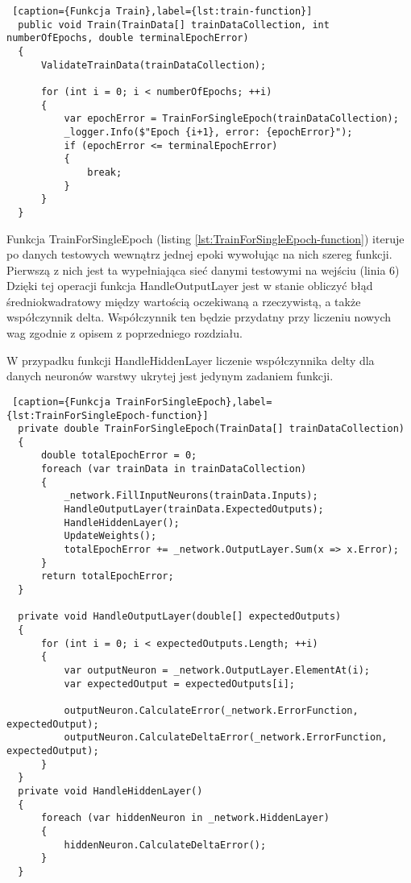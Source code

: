 \begin{lstlisting} [caption={Funkcja Train},label={lst:train-function}]
  public void Train(TrainData[] trainDataCollection, int numberOfEpochs, double terminalEpochError)
  {
      ValidateTrainData(trainDataCollection);

      for (int i = 0; i < numberOfEpochs; ++i)
      {
          var epochError = TrainForSingleEpoch(trainDataCollection);
          _logger.Info($"Epoch {i+1}, error: {epochError}");
          if (epochError <= terminalEpochError)
          {
              break;
          }
      }
  }
\end{lstlisting}

Funkcja TrainForSingleEpoch (listing \ref{lst:TrainForSingleEpoch-function}) iteruje po danych testowych wewnątrz jednej epoki wywołując na nich szereg funkcji.
Pierwszą z nich jest ta wypełniająca sieć danymi testowymi na wejściu (linia 6)
Dzięki tej operacji funkcja HandleOutputLayer jest w stanie obliczyć błąd średniokwadratowy między wartością oczekiwaną a rzeczywistą, a także współczynnik delta.
Współczynnik ten będzie przydatny przy liczeniu nowych wag zgodnie z opisem z poprzedniego rozdziału.

W przypadku funkcji HandleHiddenLayer liczenie współczynnika delty dla danych neuronów warstwy ukrytej jest jedynym zadaniem funkcji.


\begin{lstlisting} [caption={Funkcja TrainForSingleEpoch},label={lst:TrainForSingleEpoch-function}]
  private double TrainForSingleEpoch(TrainData[] trainDataCollection)
  {
      double totalEpochError = 0;
      foreach (var trainData in trainDataCollection)
      {
          _network.FillInputNeurons(trainData.Inputs);
          HandleOutputLayer(trainData.ExpectedOutputs);
          HandleHiddenLayer();
          UpdateWeights();
          totalEpochError += _network.OutputLayer.Sum(x => x.Error);
      }
      return totalEpochError;
  }

  private void HandleOutputLayer(double[] expectedOutputs)
  {
      for (int i = 0; i < expectedOutputs.Length; ++i)
      {
          var outputNeuron = _network.OutputLayer.ElementAt(i);
          var expectedOutput = expectedOutputs[i];

          outputNeuron.CalculateError(_network.ErrorFunction, expectedOutput);
          outputNeuron.CalculateDeltaError(_network.ErrorFunction, expectedOutput);
      }
  }
  private void HandleHiddenLayer()
  {
      foreach (var hiddenNeuron in _network.HiddenLayer)
      {
          hiddenNeuron.CalculateDeltaError();
      }
  }

\end{lstlisting}

